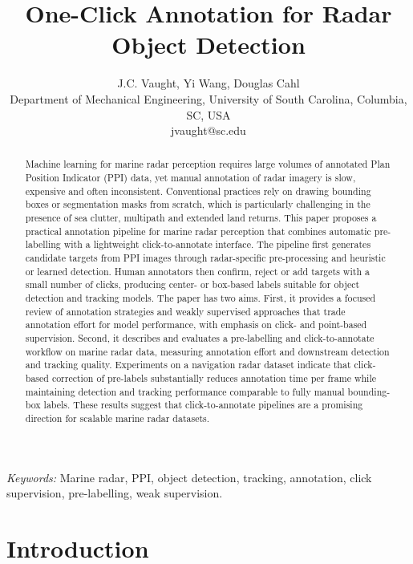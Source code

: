 \documentclass[twocolumn, 10pt]{article}
\begin{document}
\title{One-Click Annotation for Radar Object Detection}

\author{J.C. Vaught, Yi Wang, Douglas Cahl\\
\small Department of Mechanical Engineering, University of South Carolina, Columbia, SC, USA\\
\small jvaught@sc.edu}

\maketitle

\begin{abstract}
Machine learning for marine radar perception requires large volumes of annotated Plan Position Indicator (PPI) data, yet manual annotation of radar imagery is slow, expensive and often inconsistent. Conventional practices rely on drawing bounding boxes or segmentation masks from scratch, which is particularly challenging in the presence of sea clutter, multipath and extended land returns. This paper proposes a practical annotation pipeline for marine radar perception that combines automatic pre-labelling with a lightweight click-to-annotate interface. The pipeline first generates candidate targets from PPI images through radar-specific pre-processing and heuristic or learned detection. Human annotators then confirm, reject or add targets with a small number of clicks, producing center- or box-based labels suitable for object detection and tracking models. The paper has two aims. First, it provides a focused review of annotation strategies and weakly supervised approaches that trade annotation effort for model performance, with emphasis on click- and point-based supervision. Second, it describes and evaluates a pre-labelling and click-to-annotate workflow on marine radar data, measuring annotation effort and downstream detection and tracking quality. Experiments on a navigation radar dataset indicate that click-based correction of pre-labels substantially reduces annotation time per frame while maintaining detection and tracking performance comparable to fully manual bounding-box labels. These results suggest that click-to-annotate pipelines are a promising direction for scalable marine radar datasets.
\end{abstract}

\noindent\textit{Keywords:} Marine radar, PPI, object detection, tracking, annotation, click supervision, pre-labelling, weak supervision.

\section{Introduction}
\end{document}
